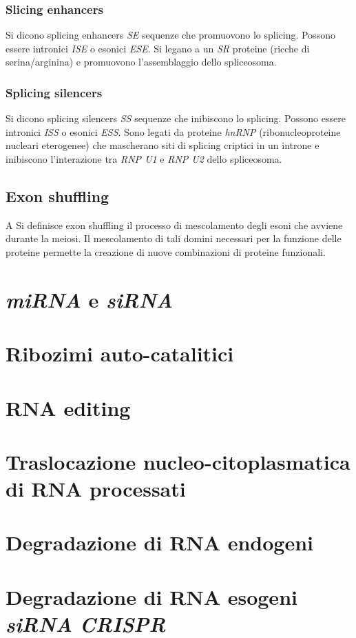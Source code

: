 \subsubsection{Slicing enhancers}
Si dicono splicing enhancers \emph{SE} sequenze che promuovono lo splicing. Possono essere intronici \emph{ISE} o esonici \emph{ESE}. Si legano a un \emph{SR} proteine (ricche di 
serina/arginina) e promuovono l'assemblaggio dello spliceosoma. \subsubsection{Splicing silencers}
Si dicono splicing silencers \emph{SS} sequenze che inibiscono lo splicing. Possono essere intronici \emph{ISS} o esonici \emph{ESS}. Sono legati da proteine \emph{hnRNP} 
(ribonucleoproteine nucleari eterogenee) che mascherano siti di splicing criptici in un introne e inibiscono l'interazione tra \emph{RNP U1} e \emph{RNP U2} dello spliceosoma. 
\subsection{Exon shuffling}A
Si definisce exon shuffling il processo di mescolamento degli esoni che avviene durante la meiosi. Il mescolamento di tali domini necessari per la funzione delle proteine permette
la creazione di nuove combinazioni di proteine funzionali. 
\section{\emph{miRNA} e \emph{siRNA}}

\section{Ribozimi auto-catalitici}

\section{RNA editing}

\section{Traslocazione nucleo-citoplasmatica di RNA processati}

\section{Degradazione di RNA endogeni}

\section{Degradazione di RNA esogeni \emph{siRNA} \emph{CRISPR}}

